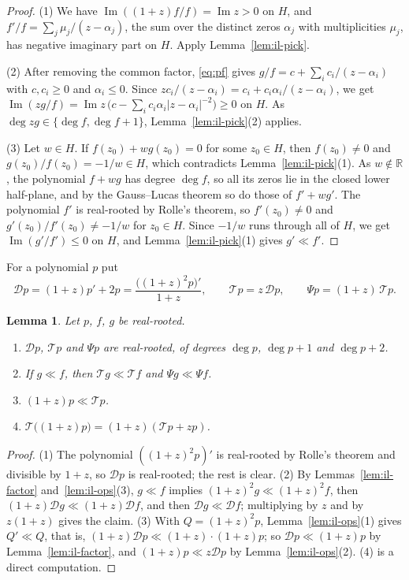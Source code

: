 \documentclass[11pt]{amsart}
\newtheorem{lemma}[theorem]{Lemma}
\theoremstyle{definition}
\begin{document}
\begin{proof}
(1) We have $\operatorname{Im}((1+z)f/f)=\operatorname{Im}z>0$ on $H$, and $f'/f=\sum_j\mu_j/(z-\alpha_j)$, the sum over the distinct zeros $\alpha_j$ with multiplicities $\mu_j$, has negative imaginary part on $H$. Apply Lemma~\ref{lem:il-pick}.

(2) After removing the common factor, \eqref{eq:pf} gives $g/f=c+\sum_ic_i/(z-\alpha_i)$ with $c,c_i\ge0$ and $\alpha_i\le0$. Since $zc_i/(z-\alpha_i)=c_i+c_i\alpha_i/(z-\alpha_i)$, we get $\operatorname{Im}(zg/f)=\operatorname{Im}z\,\bigl(c-\sum_ic_i\alpha_i|z-\alpha_i|^{-2}\bigr)\ge0$ on $H$. As $\deg zg\in\{\deg f,\deg f+1\}$, Lemma~\ref{lem:il-pick}(2) applies.

(3) Let $w\in H$. If $f(z_0)+wg(z_0)=0$ for some $z_0\in H$, then $f(z_0)\ne0$ and $g(z_0)/f(z_0)=-1/w\in H$, which contradicts Lemma~\ref{lem:il-pick}(1). As $w\notin\mathbb R$, the polynomial $f+wg$ has degree $\deg f$, so all its zeros lie in the closed lower half-plane, and by the Gauss--Lucas theorem so do those of $f'+wg'$. The polynomial $f'$ is real-rooted by Rolle's theorem, so $f'(z_0)\ne0$ and $g'(z_0)/f'(z_0)\ne-1/w$ for $z_0\in H$. Since $-1/w$ runs through all of $H$, we get $\operatorname{Im}(g'/f')\le0$ on $H$, and Lemma~\ref{lem:il-pick}(1) gives $g'\ll f'$.
\end{proof}

For a polynomial $p$ put
\[
  \mathcal Dp=(1+z)p'+2p=\frac{\bigl((1+z)^2p\bigr)'}{1+z},\qquad \mathcal Tp=z\,\mathcal Dp,\qquad \Psi p=(1+z)\,\mathcal Tp .
\]

\begin{lemma}\label{lem:il-T}
Let $p$, $f$, $g$ be real-rooted.
\begin{enumerate}
\item $\mathcal Dp$, $\mathcal Tp$ and $\Psi p$ are real-rooted, of degrees $\deg p$, $\deg p+1$ and $\deg p+2$.
\item If $g\ll f$, then $\mathcal Tg\ll\mathcal Tf$ and $\Psi g\ll\Psi f$.
\item $(1+z)p\ll\mathcal Tp$.
\item $\mathcal T\bigl((1+z)p\bigr)=(1+z)(\mathcal Tp+zp)$.
\end{enumerate}
\end{lemma}

\begin{proof}
(1) The polynomial $((1+z)^2p)'$ is real-rooted by Rolle's theorem and divisible by $1+z$, so $\mathcal Dp$ is real-rooted; the rest is clear. (2) By Lemmas~\ref{lem:il-factor} and~\ref{lem:il-ops}(3), $g\ll f$ implies $(1+z)^2g\ll(1+z)^2f$, then $(1+z)\mathcal Dg\ll(1+z)\mathcal Df$, and then $\mathcal Dg\ll\mathcal Df$; multiplying by $z$ and by $z(1+z)$ gives the claim. (3) With $Q=(1+z)^2p$, Lemma~\ref{lem:il-ops}(1) gives $Q'\ll Q$, that is, $(1+z)\mathcal Dp\ll(1+z)\cdot(1+z)p$; so $\mathcal Dp\ll(1+z)p$ by Lemma~\ref{lem:il-factor}, and $(1+z)p\ll z\mathcal Dp$ by Lemma~\ref{lem:il-ops}(2). (4) is a direct computation.
\end{proof}
\end{document}

